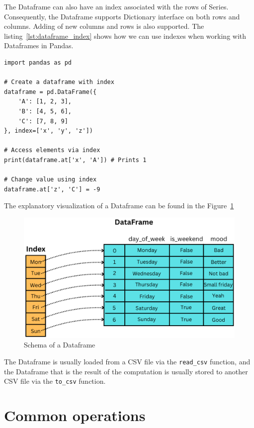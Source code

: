 The Dataframe can also have an index associated with the rows of Series.
Consequently, the Dataframe supports Dictionary interface on both rows and columns.
Adding of new columns and rows is also supported.
The listing~\ref{lst:dataframe_index} shows how we can use indexes when working with Dataframes in Pandas.

\begin{lstlisting}[caption=Index on a Dataframe, label={lst:dataframe_index}, captionpos=b]
import pandas as pd

# Create a dataframe with index
dataframe = pd.DataFrame({
    'A': [1, 2, 3],
    'B': [4, 5, 6],
    'C': [7, 8, 9]
}, index=['x', 'y', 'z'])

# Access elements via index
print(dataframe.at['x', 'A']) # Prints 1

# Change value using index
dataframe.at['z', 'C'] = -9
\end{lstlisting}

The explanatory visualization of a Dataframe can be found in the Figure~\ref{fig:dataframe_schema}

\begin{figure}[H]
    \caption{Schema of a Dataframe}
    \label{fig:dataframe_schema}
    \centering
    \includegraphics[scale=0.4]{img/Dataframe}
\end{figure}

The Dataframe is usually loaded from a CSV file via the \verb|read_csv| function, and the Dataframe that is the result
of the computation is usually stored to another CSV file via the \verb|to_csv| function.


\section{Common operations} %

